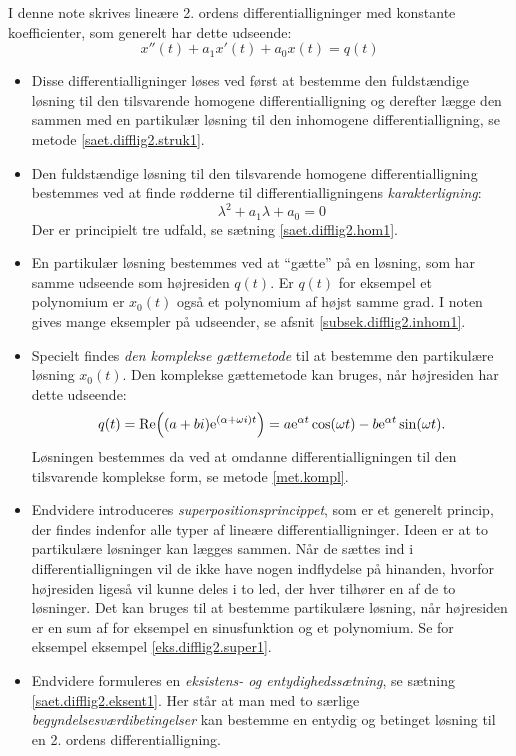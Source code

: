 \begin{summary}
I denne note skrives lineære 2. ordens differentialligninger med konstante koefficienter, som generelt har dette udseende:
\begin{equation}
x''(t) + a_1 x'(t) + a_0 x(t) = q(t)
\end{equation}
\begin{itemize}
\item Disse differentialligninger løses ved først at bestemme den fuldstændige løsning til den tilsvarende homogene differentialligning og derefter lægge den sammen med en partikulær løsning til den inhomogene differentialligning, se metode \ref{saet.difflig2.struk1}.
\item Den fuldstændige løsning til den tilsvarende homogene differentialligning bestemmes ved at finde rødderne til differentialligningens \textit{karakterligning}:
\begin{equation}
\lambda^2 + a_1 \lambda + a_0 = 0
\end{equation}
Der er principielt tre udfald, se sætning \ref{saet.difflig2.hom1}.
\item En partikulær løsning bestemmes ved at ``gætte'' på en løsning, som har samme udseende som højresiden $ q(t) $. Er $ q(t) $ for eksempel et polynomium er $ x_0(t) $ også et polynomium af højst samme grad. I noten gives mange eksempler på udseender, se afsnit \ref{subsek.difflig2.inhom1}.
\item Specielt findes \textit{den komplekse gættemetode} til at bestemme den partikulære løsning $ x_0(t) $. Den komplekse gættemetode kan bruges, når højresiden har dette udseende:
\begin{equation}
q(t) = \mathrm{Re} \! \left((a+bi) \mathrm{e}^{(\alpha + \omega i)t}\right) = a \mathrm{e}^{\alpha t}\cos(\omega t) - b \mathrm{e}^{\alpha t} \sin(\omega t).
\end{equation}
Løsningen bestemmes da ved at omdanne differentialligningen til den tilsvarende komplekse form, se metode \ref{met.kompl}.
\item Endvidere introduceres \textit{superpositionsprincippet}, som er et generelt princip, der findes indenfor alle typer af lineære differentialligninger. Ideen er at to partikulære løsninger kan lægges sammen. Når de sættes ind i differentialligningen vil de ikke have nogen indflydelse på hinanden, hvorfor højresiden ligeså vil kunne deles i to led, der hver tilhører en af de to løsninger. Det kan bruges til at bestemme partikulære løsning, når højresiden er en sum af for eksempel en sinusfunktion og et polynomium. Se for eksempel eksempel \ref{eks.difflig2.super1}.
\item Endvidere formuleres en \textit{eksistens- og entydighedssætning}, se sætning \ref{saet.difflig2.eksent1}. Her står at man med to særlige \textit{begyndelsesværdibetingelser} kan bestemme en entydig og betinget løsning til en 2. ordens differentialligning.
\end{itemize}
\end{summary}


